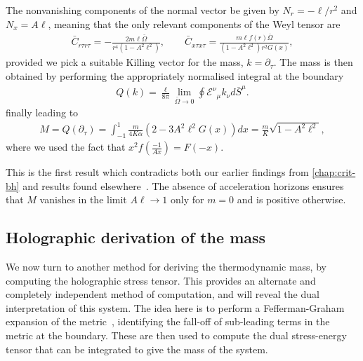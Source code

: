 \documentclass[
twoside,
openright,
frontopenright,
]{dmathesis}
\begin{document}
The nonvanishing components of the normal vector be given by $N_r = -\ell/r^2$
and $N_x = A\ell$, meaning that the only relevant components of the Weyl tensor
are
\begin{align}
  \bar{C}_{r\tau r\tau} = -\frac{2m \ell \bar{\Omega}}{r^4(1-A^2\ell^2)}, \qquad
  \bar{C}_{x\tau x\tau} = \frac{m\ell f(r)\bar{\Omega}}{(1-A^2\ell^2) r^2G(x)},
\end{align}
provided we pick a suitable Killing vector for the mass, $k =
\partial_\tau$. The mass is then obtained by performing the appropriately
normalised integral at the boundary
\begin{align}
Q(k)=\frac{\ell}{8\pi}\lim_{\bar{\Omega} \to 0}\oint
\mathcal{E}^\nu{}_\mu k_{\nu }d\bar{S}^{\mu }.
\end{align}
finally leading to
\begin{align}\label{confmass}
M = Q(\partial _{\tau}) =
  \int_{-1}^1\frac{m}{4K\alpha}\left(2-3A^2\ell^2G(x)\right) dx = \frac{m}{K}\sqrt{1-A^2\ell^2},
\end{align}
where we used the fact that $x^2 f(\frac{-1}{Ax}) = F(-x)$.

This is the first result which contradicts both our earlier findings from
\cref{chap:crit-bh} and results found
elsewhere~\cite{Appels:2016uha,Astorino:2016ybm,Appels:2017xoe}. The absence of
acceleration horizons ensures that $M$ vanishes in the limit $A\ell\to 1$ only
for $m=0$ and is positive otherwise.

\subsection{Holographic derivation of the mass}
\label{sec:hologr-deriv-mass}

We now turn to another method for deriving the thermodynamic mass, by computing
the holographic stress tensor. This provides an alternate and completely
independent method of computation, and will reveal the dual interpretation of
this system.  The idea here is to perform a Fefferman-Graham expansion of the
metric~\cite{Fefferman:2007rka}, identifying the fall-off of sub-leading terms
in the metric at the boundary. These are then used to compute the dual
stress-energy tensor that can be integrated to give the mass of the system.
\end{document}
